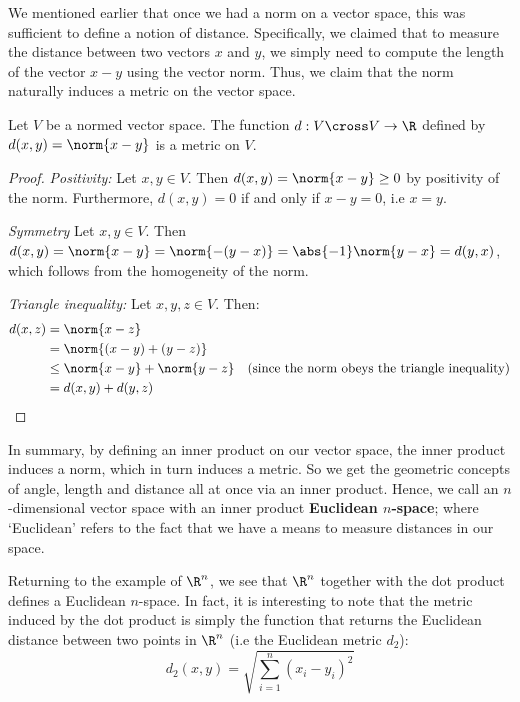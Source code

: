 We mentioned earlier that once we had a norm on a vector space, this was sufficient to define a notion of distance. Specifically, we claimed that to measure the distance between two vectors \( x \) and \( y \), we simply need to compute the length of the vector \( x-y \) using the vector norm. Thus, we claim that the norm naturally induces a metric on the vector space.

\begin{theorem}
  Let \( V \) be a normed vector space. The function \( d:V\cross V\to\R \) defined by \( d(x,y)=\norm{x-y} \) is a metric on \( V \).
\end{theorem}
\begin{proof}
  \emph{Positivity:} Let \( x,y\in V \). Then \( d(x,y)=\norm{x-y}\geq 0 \) by positivity of the norm. Furthermore, \( d(x,y)=0 \) if and only if \( x-y=0 \), i.e \( x=y \).

  \vspace{3mm}

  \emph{Symmetry} Let \( x,y\in V \). Then \( d(x,y)=\norm{x-y}=\norm{-(y-x)}=\abs{-1}\norm{y-x}=d(y,x) \), which follows from the homogeneity of the norm.

  \vspace{3mm}

  \emph{Triangle inequality:} Let \( x,y,z\in V \). Then:
  \begin{align*}
    d(x,z)&= \norm{x-z}\\
    &= \norm{(x-y)+(y-z)}\\
    &\leq \norm{x-y}+\norm{y-z} &(\text{since the norm obeys the triangle inequality})\\
    &= d(x,y)+d(y,z)
  \end{align*}
\end{proof}

In summary, by defining an inner product on our vector space, the inner product induces a norm, which in turn induces a metric. So we get the geometric concepts of angle, length and distance all at once via an inner product. Hence, we call an \( n \)-dimensional vector space with an inner product \textbf{Euclidean \( n \)-space}; where `Euclidean' refers to the fact that we have a means to measure distances in our space.

\vspace{3mm}

Returning to the example of \( \R^n \), we see that \( \R^n \) together with the dot product defines a Euclidean \( n \)-space. In fact, it is interesting to note that the metric induced by the dot product is simply the function that returns the Euclidean distance between two points in \( \R^n \) (i.e the Euclidean metric \( d_2 \)):
\[ d_2(x,y)=\sqrt{\sum_{i=1}^n(x_i-y_i)^2} \]

